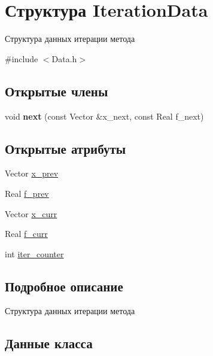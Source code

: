 \hypertarget{structIterationData}{}\section{Структура Iteration\+Data}
\label{structIterationData}


Структура данных итерации метода  




{\ttfamily \#include $<$Data.\+h$>$}

\subsection*{Открытые члены}
\begin{DoxyCompactItemize}
\item 
\mbox{\label{structIterationData_aefe60b0e2b945214d0fbb47be4f2f284}} 
void {\bfseries next} (const Vector \&x\+\_\+next, const Real f\+\_\+next)
\end{DoxyCompactItemize}
\subsection*{Открытые атрибуты}
\begin{DoxyCompactItemize}
\item 
Vector \mbox{\hyperlink{structIterationData_a38b2cd3fa64b815db288dc609d04ce75}{x\+\_\+prev}}
\item 
Real \mbox{\hyperlink{structIterationData_a7f0c8b8605e8ef5e0e11d753668f8db0}{f\+\_\+prev}}
\item 
Vector \mbox{\hyperlink{structIterationData_a747b834728d763e1d963b4cf48070a82}{x\+\_\+curr}}
\item 
Real \mbox{\hyperlink{structIterationData_afb4e4b7e351a408b3a29a1cf87413db1}{f\+\_\+curr}}
\item 
int \mbox{\hyperlink{structIterationData_a7308a9e6f23ac24d49919a6355638f45}{iter\+\_\+counter}}
\end{DoxyCompactItemize}


\subsection{Подробное описание}
Структура данных итерации метода 

\subsection{Данные класса}
\mbox{\label{structIterationData_afb4e4b7e351a408b3a29a1cf87413db1}} 
